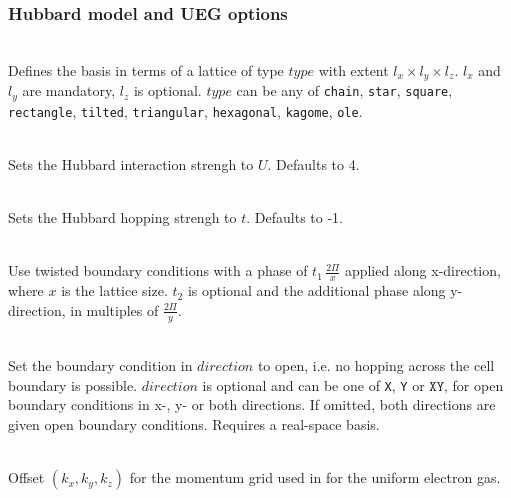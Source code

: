 \documentclass[a4paper,notitlepage,dvipsnames]{scrreprt}
\newcommand\codeitem[1]{\needspace{1.5\baselineskip}\item[\textnormal{\ttfamily #1 \nopagebreak}] \hfill \\ \nopagebreak}
\begin{document}
  \subsubsection{Hubbard model and UEG options}
  \begin{description}
    \codeitem{lattice $type$ $l_x$ $l_y$ $l_Z$}
    Defines the basis in terms of a lattice of type $type$ with extent $l_x
    \times l_y \times l_z$. $l_x$ and $l_y$ are mandatory, $l_z$ is
    optional. $type$ can be any of \texttt{chain}, \texttt{star},
    \texttt{square}, \texttt{rectangle}, \texttt{tilted}, \texttt{triangular},
    \texttt{hexagonal}, \texttt{kagome}, \texttt{ole}. 
    \codeitem{U $U$}
    Sets the Hubbard interaction strengh to $U$. Defaults to 4.
    \codeitem{B $t$}
    Sets the Hubbard hopping strengh to $t$. Defaults to -1.
    \codeitem{twisted-bc $t_1$ $t_2$}
    Use twisted boundary conditions with a phase of $t_1 \, \frac{2\Pi}{x}$
    applied along x-direction, where $x$ is the lattice size. $t_2$ is
    optional and the additional phase along y-direction, in multiples of
    $\frac{2\Pi}{y}$.
    \codeitem{open-bc $direction$}
    Set the boundary condition in $direction$ to open, i.e. no hopping across
    the cell boundary is possible. $direction$ is optional and can be one of
    \texttt{X}, \texttt{Y} or $\texttt{XY}$, for open boundary conditions in
    x-, y- or both directions. If omitted, both directions are given open
    boundary conditions. Requires a real-space basis.
    \codeitem{ueg-offset $k_x$ $k_y$ $k_z$}
    Offset $(k_x, k_y, k_z)$ for the momentum grid used in for the uniform
    electron gas.
  \end{description}
\end{document}
